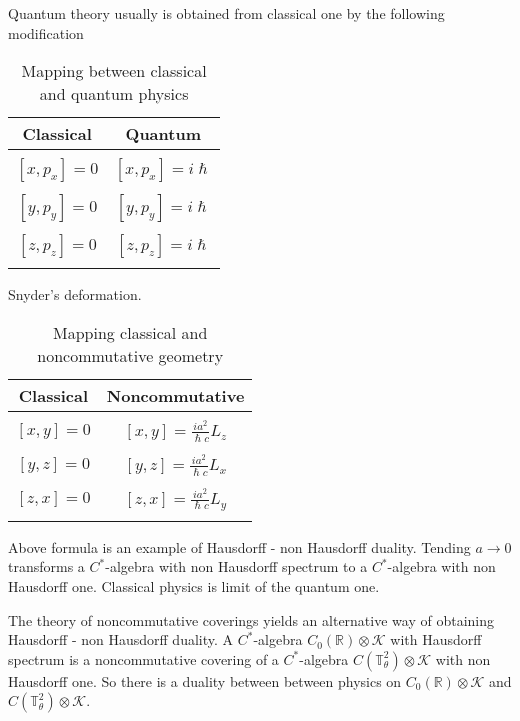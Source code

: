 \documentclass{beamer}
\theoremstyle{plain}
\begin{document}
\begin{frame}
Quantum theory usually is obtained from classical one by the following modification
\break
\begin {table}[H]
\caption {Mapping between classical and quantum physics} \label{main_mapping_table} 
\begin{center}
	\begin{tabular}{|c|c|}
		\hline
		Classical  & Quantum\\
		\hline
		&\\
		$\left[ x, p_x\right] = 0$ & $\left[ x, p_x\right] = i \hslash$ \\
		&\\
		$\left[ y, p_y\right] = 0$ & $\left[ y, p_y\right] = i \hslash$\\
		&\\
$\left[ z, p_z\right] = 0$ & $\left[ z, p_z\right] = i \hslash$\\
	&\\		\hline
	\end{tabular}
\end{center}
\end {table}


\end{frame}
\begin{frame}
	Snyder's deformation.
	\break
	\begin {table}[H]
	\caption {Mapping classical  and noncommutative geometry} \label{s_mapping_table} 
	\begin{center}
		\begin{tabular}{|c|c|}
			\hline
			Classical  & Noncommutative\\
			\hline
			&\\
			$\left[ x, y\right] = 0$ & $\left[ x, y\right] = \frac{i a^2}{\hslash c}L_z$ \\
			&\\
$\left[ y, z\right] = 0$ & $\left[ y, z\right] = \frac{i a^2}{\hslash c}L_x$ \\
			&\\
$\left[ z, x\right] = 0$ & $\left[ z, x\right] = \frac{i a^2}{\hslash c}L_y$ \\
	&\\			\hline
		\end{tabular}
	\end{center}
	\end {table}
Above formula is an example of Hausdorff - non Hausdorff duality. Tending $a \to 0$ transforms a $C^*$-algebra with non Hausdorff spectrum to a $C^*$-algebra with non Hausdorff one. Classical physics is limit of the quantum one.	
\end{frame}
\begin{frame}
	The theory of noncommutative coverings yields an alternative way of obtaining Hausdorff - non Hausdorff duality. A $C^*$-algebra 	$C_0\left( \mathbb R \right) \otimes \mathcal K$  with Hausdorff spectrum is a noncommutative covering of a $C^*$-algebra 	$C\left( \mathbb T^2_\theta \right) \otimes \mathcal K$ with non Hausdorff one. So there is a duality between between physics on
	$C_0\left( \mathbb R \right) \otimes \mathcal K$  and	$C\left( \mathbb T^2_\theta \right) \otimes \mathcal K$.
\end{frame}
\end{document}

